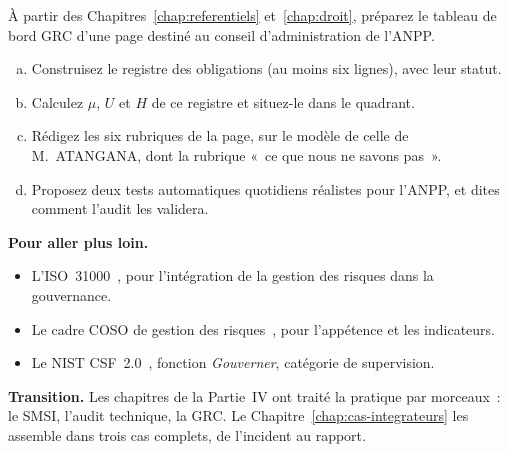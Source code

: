 \begin{boxexo}[title={\ding{45}\quad Exercice~13.4. La page de l'ANPP \niveauexpert}]
À partir des Chapitres~\ref{chap:referentiels} et~\ref{chap:droit},
préparez le tableau de bord GRC d'une page destiné au conseil
d'administration de l'ANPP.
\begin{enumerate}[(a)]
    \item Construisez le registre des obligations (au moins six lignes),
          avec leur statut.
    \item Calculez $\mu$, $U$ et $H$ de ce registre et situez-le dans le
          quadrant.
    \item Rédigez les six rubriques de la page, sur le modèle de celle de
          M.~ATANGANA, dont la rubrique «~ce que nous ne savons pas~».
    \item Proposez deux tests automatiques quotidiens réalistes pour
          l'ANPP, et dites comment l'audit les validera.
\end{enumerate}
\end{boxexo}

\bigskip

\begin{boxinfo}
\textbf{Pour aller plus loin.}
\begin{itemize}
    \item L'ISO~31000~\cite{iso31000_2018}, pour l'intégration de la gestion
          des risques dans la gouvernance.
    \item Le cadre COSO de gestion des risques~\cite{coso2017erm}, pour
          l'appétence et les indicateurs.
    \item Le NIST CSF~2.0~\cite{nist2024csf}, fonction \emph{Gouverner},
          catégorie de supervision.
\end{itemize}
\end{boxinfo}

\begin{boxinfo}
\textbf{Transition.} Les chapitres de la Partie~IV ont traité la pratique
par morceaux~: le SMSI, l'audit technique, la GRC. Le
Chapitre~\ref{chap:cas-integrateurs} les assemble dans trois cas complets,
de l'incident au rapport.
\end{boxinfo}
